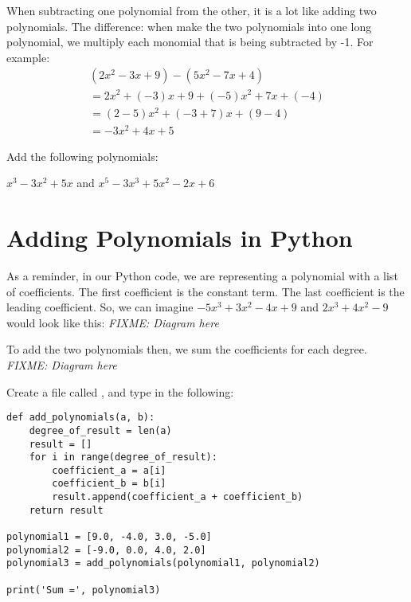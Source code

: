 When subtracting one polynomial from the other, it is a lot like
adding two polynomials. The difference: when make the two polynomials
into one long polynomial, we multiply each monomial that is being
subtracted by -1. For example:
\begin{multline*}
  (2x^2 - 3x + 9) - (5x^2 - 7x + 4) \\
  = 2x^2 + (-3)x + 9 + (-5)x^2 + 7x + (-4) \\
  = (2 - 5)x^2 + (-3 + 7)x + (9-4) \\
  = -3x^2 + 4x + 5
\end{multline*}

\begin{Exercise}[title=Subtracting Polynomials Practice, label=subtractpns]
  Add the following polynomials:
  \vspace{20mm}
  \vspace{20mm}
\end{Exercise}
\begin{Answer}[ref=subtractpns]$x^3 - 3x^2 + 5x$ and $x^5 - 3x^3 + 5x^2 - 2x + 6$\end{Answer}

\section{Adding Polynomials in Python}

As a reminder, in our Python code, we are representing a polynomial
with a list of coefficients.  The first coefficient is the constant
term. The last coefficient is the leading coefficient. So, we can
imagine $-5x^3 + 3x^2 - 4x + 9$ and $2x^3 +4x^2 - 9$ would look
like this: \textit{FIXME: Diagram here}

To add the two polynomials then, we sum the coefficients for each degree.
\textit{FIXME: Diagram here}

Create a file called , and type in the following: 
\begin{Verbatim}
def add_polynomials(a, b):
    degree_of_result = len(a)
    result = []
    for i in range(degree_of_result):
        coefficient_a = a[i]
        coefficient_b = b[i]
        result.append(coefficient_a + coefficient_b)
    return result

polynomial1 = [9.0, -4.0, 3.0, -5.0]
polynomial2 = [-9.0, 0.0, 4.0, 2.0]
polynomial3 = add_polynomials(polynomial1, polynomial2)

print('Sum =', polynomial3)
\end{Verbatim}

